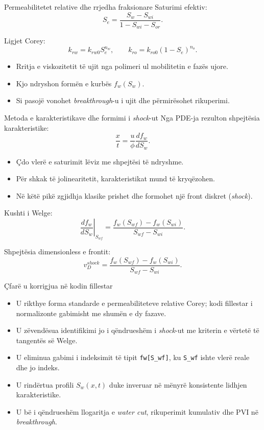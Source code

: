 \documentclass[aspectratio=169]{beamer}
\begin{document}
\begin{frame}{Permeabilitetet relative dhe rrjedha fraksionare}
Saturimi efektiv:
\[
S_e=\frac{S_w-S_{wi}}{1-S_{wi}-S_{or}}.
\]

Ligjet Corey:
\[
k_{rw}=k_{rw0} S_e^{n_w}, \qquad
k_{ro}=k_{ro0}(1-S_e)^{n_o}.
\]

\begin{itemize}
  \item Rritja e viskozitetit të ujit nga polimeri ul mobilitetin e fazës ujore.
  \item Kjo ndryshon formën e kurbës $f_w(S_w)$.
  \item Si pasojë vonohet \textit{breakthrough}-u i ujit dhe përmirësohet rikuperimi.
\end{itemize}
\end{frame}

\begin{frame}{Metoda e karakteristikave dhe formimi i \textit{shock}-ut}
Nga PDE-ja rezulton shpejtësia karakteristike:
\[
\frac{x}{t}=\frac{u}{\phi}\frac{df_w}{dS_w}.
\]

\begin{itemize}
  \item Çdo vlerë e saturimit lëviz me shpejtësi të ndryshme.
  \item Për shkak të jolinearitetit, karakteristikat mund të kryqëzohen.
  \item Në këtë pikë zgjidhja klasike prishet dhe formohet një front diskret (\textit{shock}).
\end{itemize}

Kushti i Welge:
\[
\left.\frac{df_w}{dS_w}\right|_{S_{wf}}
=
\frac{f_w(S_{wf})-f_w(S_{wi})}{S_{wf}-S_{wi}}.
\]

Shpejtësia dimensionless e frontit:
\[
v_D^{shock}=\frac{f_w(S_{wf})-f_w(S_{wi})}{S_{wf}-S_{wi}}.
\]
\end{frame}

\begin{frame}{Çfarë u korrigjua në kodin fillestar}
\begin{itemize}
  \item U rikthye forma standarde e permeabiliteteve relative Corey; kodi fillestar i normalizonte gabimisht me shumën e dy fazave.
  \item U zëvendësua identifikimi jo i qëndrueshëm i \textit{shock}-ut me kriterin e vërtetë të tangentës së Welge.
  \item U eliminua gabimi i indeksimit të tipit \verb|fw[S_wf]|, ku \verb|S_wf| ishte vlerë reale dhe jo indeks.
  \item U rindërtua profili $S_w(x,t)$ duke inveruar në mënyrë konsistente lidhjen karakteristike.
  \item U bë i qëndrueshëm llogaritja e \textit{water cut}, rikuperimit kumulativ dhe PVI në \textit{breakthrough}.
\end{itemize}
\end{frame}
\end{document}
